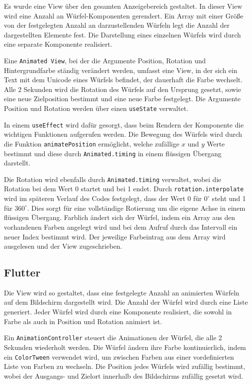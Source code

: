 Es wurde eine View über den gesamten Anzeigebereich gestaltet. In dieser View wird eine Anzahl an Würfel-Komponenten gerendert. Ein Array mit einer Größe von der festgelegten Anzahl an darzustellenden Würfeln legt die Anzahl der dargestellten Elemente fest. Die Darstellung eines einzelnen Würfels wird durch eine separate Komponente realisiert. 

Eine \texttt{Animated View}, bei der die Argumente Position, Rotation und Hintergrundfarbe ständig verändert werden, umfasst eine View, in der sich ein Text mit dem Unicode eines Würfels befindet, der dauerhaft die Farbe wechselt. Alle 2 Sekunden wird die Rotation des Würfels auf den Ursprung gesetzt, sowie eine neue Zielposition bestimmt und eine neue Farbe festgelegt. Die Argumente Position und Rotation werden über einen \texttt{useState} verwaltet. 

In einem \texttt{useEffect} wird dafür gesorgt, dass beim Rendern der Komponente die wichtigen Funktionen aufgerufen werden. Die Bewegung des Würfels wird durch die Funktion \texttt{animatePosition} ermöglicht, welche zufällige \(x\) und \(y\) Werte bestimmt und diese durch \texttt{Animated.timing} in einem flüssigen Übergang darstellt. 

Die Rotation wird ebenfalls durch \texttt{Animated.timing} verwaltet, wobei die Rotation bei dem Wert 0 startet und bei 1 endet. Durch \texttt{rotation.interpolate} wird im späteren Verlauf des Codes festgelegt, dass der Wert 0 für \(0^\circ\) steht und 1 für \(360^\circ\). Dies sorgt für eine vollständige Rotierung um die eigene Achse in einem flüssigen Übergang. Farblich ändert sich der Würfel, indem ein Array aus den vorhandenen Farben angelegt wird und bei dem Aufruf durch das Intervall ein neuer Index bestimmt wird. Der jeweilige Farbeintrag aus dem Array wird ausgelesen und der View zugeschrieben.

\subsection*{Flutter}

Die View wird so gestaltet, dass eine festgelegte Anzahl an animierten Würfeln auf dem Bildschirm dargestellt wird. Die Anzahl der Würfel wird durch eine Liste generiert. Jeder Würfel wird durch eine Komponente realisiert, die sowohl in Farbe als auch in Position und Rotation animiert ist. 

Ein \texttt{AnimationController} steuert die Animationen der Würfel, die alle 2 Sekunden wiederholt werden. Die Würfel ändern ihre Farbe kontinuierlich, indem ein \texttt{ColorTween} verwendet wird, um zwischen Farben aus einer vordefinierten Liste von Farben zu wechseln. Die Position jedes Würfels wird zufällig bestimmt, wobei der Ausgangs- und Zielort innerhalb des Bildschirms zufällig gesetzt wird. 

